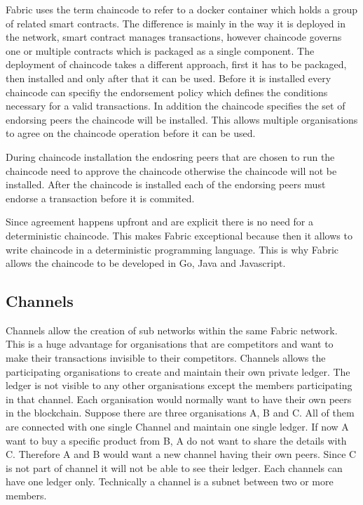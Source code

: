 Fabric uses the term chaincode to refer to a docker container which holds a group of related smart contracts. The difference is mainly in the way it is deployed in the network, smart contract manages transactions, however chaincode governs one or multiple contracts which is packaged as a single component. The deployment of chaincode takes a different approach, first it has to be packaged, then installed and only after that it can be used. Before it is installed every chaincode can specifiy the endorsement policy which defines the conditions necessary for a valid transactions. In addition the chaincode specifies the set of  endorsing peers the chaincode will be installed. This allows multiple organisations to agree on the chaincode operation before it can be used. 


During chaincode installation the endosring peers that are chosen to run the chaincode need to approve the chaincode otherwise the chaincode will not be installed. After the chaincode is installed each of the endorsing peers must endorse a transaction before it is commited. 



Since agreement happens upfront and are explicit there is no need for a deterministic chaincode. This makes Fabric exceptional because then it allows to write chaincode in a deterministic programming language. This is why Fabric allows the chaincode to be developed in Go, Java and Javascript. 




\subsection{Channels}

Channels allow the creation of sub networks within the same Fabric network. This is a huge advantage for organisations that are competitors and want to make their transactions invisible to their competitors. Channels allows the participating organisations to create and maintain their own private ledger. The ledger is not visible to any other organisations except the members participating in that channel. 
Each organisation would normally want to have their own peers in the blockchain. Suppose there are three organisations A, B and C. All of them are connected with one single Channel and maintain one single ledger. If now A want to buy a specific product from B, A do not want to share the details with C. Therefore A and B would want a new channel having their own peers. Since C is not part of channel it will not be able to see their ledger. Each channels can have one ledger only. 
Technically a channel is a subnet between two or more members.  

